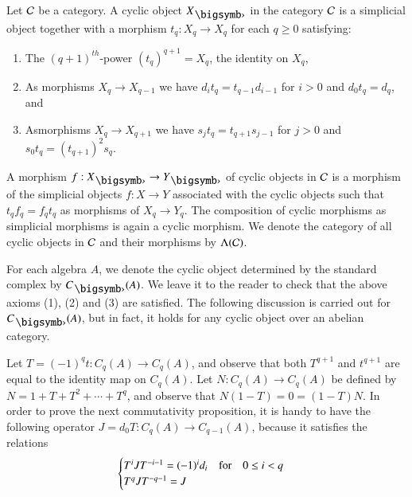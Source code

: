 \begin{definition}\label{chap3-defi3.2}
Let $\mathcal{C}$ be a category. A cyclic object $X_{\bigdot}$ in the category
$\mathcal{C}$ is a simplicial object together with a morphism $t_{q}:X_{q}\to
X_{q}$ for each $q\geq 0$ satisfying:
\begin{enumerate}
\renewcommand{\labelenumi}{(\theenumi)}
\item The $(q+1)^{th}$-power $(t_{q})^{q+1}=X_{q}$, the identity on
  $X_{q}$,

\item As morphisms $X_{q}\to X_{q-1}$ we have
  $d_{i}t_{q}=t_{q-1}d_{i-1}$ for $i>0$ and $d_{0}t_{q}=d_{q}$, and 

\item As\pageoriginale morphisms $X_{q}\to X_{q+1}$ we have
  $s_{j}t_{q}=t_{q+1}s_{j-1}$ for $j>0$ and
  $s_{0}t_{q}=(t_{q+1})^{2}s_{q}$. 
\end{enumerate}

A morphism $f:X_{\bigdot}\to Y_{\bigdot}$ of cyclic objects in $\mathcal{C}$ is
a morphism of the simplicial objects $f:X\to Y$ associated with the
cyclic objects such that $t_{q}f_{q}=f_{q}t_{q}$ as morphisms of
$X_{q}\to Y_{q}$. The composition of cyclic morphisms as simplicial
morphisms is again a cyclic morphism. We denote the category of all
cyclic objects in $\mathcal{C}$ and their morphisms by $\Lambda(\mathcal{C})$. 
\end{definition}

For each algebra $A$, we denote the cyclic object determined by the
standard complex by $C_{\bigdot}(A)$. We leave it to the reader to
check that the above axioms (1), (2) and (3) are satisfied. The
following discussion is carried out for $C_{\bigdot}(A)$, but in fact,
it holds for any cyclic object over an abelian category.

\begin{notation}\label{chap3-not3.3}
Let $T=(-1)^{q}t:C_{q}(A)\to C_{q}(A)$, and observe that both
$T^{q+1}$ and $t^{q+1}$ are equal to the identity map on
$C_{q}(A)$. Let $N:C_{q}(A)\to C_{q}(A)$ be defined by
$N=1+T+T^{2}+\cdots+T^{q}$, and observe that $N(1-T)=0=(1-T)N$. In
order to prove the next commutativity proposition, it is handy to have
the following operator $J=d_{0}T:C_{q}(A)\to C_{q-1}(A)$, because it
satisfies the relations
$$
\begin{cases}
T^{i}JT^{-i-1}=(-1)^{i}d_{i}\quad\text{for}\quad 0\leq i<q\\
T^{q}JT^{-q-1}=J
\end{cases}
$$
\end{notation}

